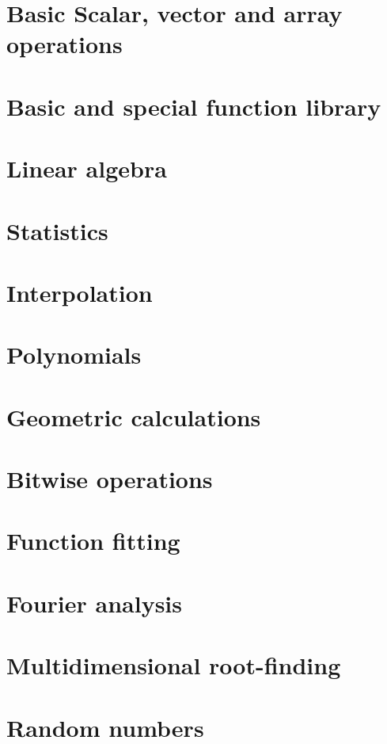 \documentclass[10pt,titleauthor,openany]{mwbk}
\begin{document}
  \section{Basic Scalar, vector and array operations}
  
  \section{Basic and special function library}
  
  \section{Linear algebra}
  
  \section{Statistics}
  
  \section{Interpolation}
  
  \section{Polynomials}
  
  \section{Geometric calculations}
  
  \section{Bitwise operations}
  
  \section{Function fitting}
  
  \section{Fourier analysis}
  
  \section{Multidimensional root-finding}
  
  \section{Random numbers}
  
\end{document}
